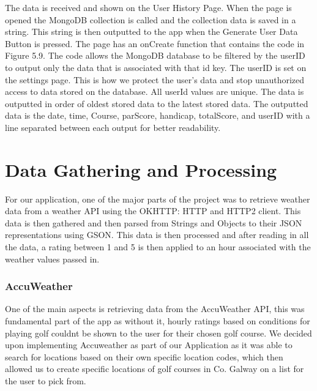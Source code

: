 The data is received and shown on the User History Page. When the page is opened the MongoDB collection is called and the collection data is saved in a string. This string is then outputted to the app when the Generate User Data Button is pressed. \newline
The page has an onCreate function that contains the code in Figure 5.9. The code allows the MongoDB database to be filtered by the userID to output only the data that is associated with that id key. The userID is set on the settings page. This is how we protect the user’s data and stop unauthorized access to data stored on the database. All userId values are unique. The data is outputted in order of oldest stored data to the latest stored data. The outputted data is the date, time, Course, parScore, handicap, totalScore, and userID with a line separated between each output for better readability.

\section{Data Gathering and Processing}
For our application, one of the major parts of the project was to retrieve weather data from a weather API using the OKHTTP: HTTP and HTTP2 client. This data is then gathered and then parsed from Strings and Objects to their JSON representations using GSON. This data is then processed and after reading in all the data, a rating between 1 and 5 is then applied to an hour associated with the weather values passed in.

\subsubsection{AccuWeather}
One of the main aspects is retrieving data from the AccuWeather API, this was fundamental part of the app as without it, hourly ratings based on conditions for playing golf couldnt be shown to the user for their chosen golf course. We decided upon implementing Accuweather as part of our Application as it was able to search for locations based on their own specific location codes, which then allowed us to create specific locations of golf courses in Co. Galway on a list for the user to pick from.

